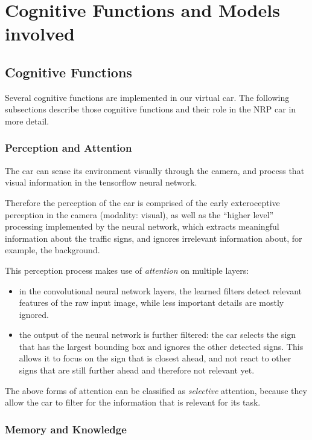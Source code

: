 
\section{Cognitive Functions and Models involved}

\subsection{Cognitive Functions}
Several cognitive functions are implemented in our virtual car. 
The following subsections describe those cognitive functions and their role in the NRP car in more detail.

\subsubsection{Perception and Attention}
The car can sense its environment visually through the camera, and process that visual information in the tensorflow \cite{tensorflow2015-whitepaper} neural network.

Therefore the perception of the car is comprised of the early exteroceptive perception in the camera (modality: visual), as well as the ``higher level'' processing implemented by the neural network, which extracts meaningful information about the traffic signs, and ignores irrelevant information about, for example, the background. 

This perception process makes use of \emph{attention} on multiple layers:
\begin{itemize}
 \item in the convolutional neural network layers, the learned filters detect relevant features of the raw input image, while less important details are mostly ignored.
 \item the output of the neural network is further filtered: the car selects the sign that has the largest bounding box and ignores the other detected signs. This allows it to focus on the sign that is closest ahead, and not react to other signs that are still further ahead and therefore not relevant yet. 
\end{itemize}
The above forms of attention can be classified as \emph{selective} attention, because they allow the car to filter for the information that is relevant for its task.

\subsubsection{Memory and Knowledge}

